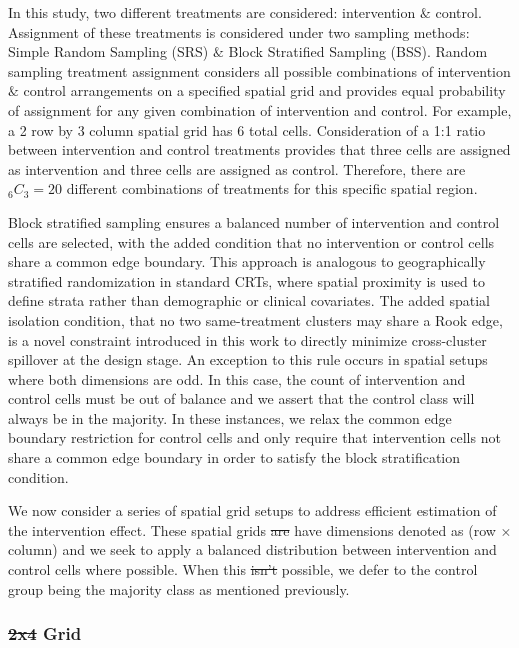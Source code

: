 \documentclass{article}[11pt]
\makeatletter
\providecommand{\DIFaddtex}[1]{{\protect\color{blue}\uwave{#1}}} %
\providecommand{\DIFdeltex}[1]{{\protect\color{red}\sout{#1}}} %
\providecommand{\DIFaddbegin}{} %
\providecommand{\DIFaddend}{} %
\providecommand{\DIFdelbegin}{} %
\providecommand{\DIFdelend}{} %
\providecommand{\DIFadd}[1]{\texorpdfstring{\DIFaddtex{#1}}{#1}} %
\providecommand{\DIFdel}[1]{\texorpdfstring{\DIFdeltex{#1}}{}} %
\providecommand{\DIFscaledelfig}{0.5}
\newlength{\DIFdelgraphicswidth} %
\newlength{\DIFdelgraphicsheight} %
\providecommand{\DIFaddincludegraphics}[2][]{{\color{blue}\fbox{\DIFOincludegraphics[#1]{#2}}}} %
\providecommand{\DIFdelincludegraphics}[2][]{%
\sbox{\DIFdelgraphicsbox}{\DIFOincludegraphics[#1]{#2}}%
\settoboxwidth{\DIFdelgraphicswidth}{\DIFdelgraphicsbox} %
\settoboxtotalheight{\DIFdelgraphicsheight}{\DIFdelgraphicsbox} %
\scalebox{\DIFscaledelfig}{%
\parbox[b]{\DIFdelgraphicswidth}{\usebox{\DIFdelgraphicsbox}\\[-\baselineskip] \rule{\DIFdelgraphicswidth}{0em}}\llap{\resizebox{\DIFdelgraphicswidth}{\DIFdelgraphicsheight}{%
\setlength{\unitlength}{\DIFdelgraphicswidth}%
\begin{picture}(1,1)%
\thicklines\linethickness{2pt} %
{\color[rgb]{1,0,0}\put(0,0){\framebox(1,1){}}}%
{\color[rgb]{1,0,0}\put(0,0){\line( 1,1){1}}}%
{\color[rgb]{1,0,0}\put(0,1){\line(1,-1){1}}}%
\end{picture}%
}\hspace*{3pt}}} %
} %
\DeclareRobustCommand{\DIFaddbegin}{\DIFOaddbegin \let\includegraphics\DIFaddincludegraphics} %
\DeclareRobustCommand{\DIFaddend}{\DIFOaddend \let\includegraphics\DIFOincludegraphics} %
\DeclareRobustCommand{\DIFdelbegin}{\DIFOdelbegin \let\includegraphics\DIFdelincludegraphics} %
\DeclareRobustCommand{\DIFdelend}{\DIFOaddend \let\includegraphics\DIFOincludegraphics} %
\let\sout@orig\sout %
\renewcommand{\sout}[1]{\ifmmode\text{\sout@orig{\ensuremath{#1}}}\else\sout@orig{#1}\fi} %
\makeatother
\begin{document}
In this study, two different treatments are considered: intervention $\&$ control. Assignment of these treatments is considered under two sampling methods: Simple Random Sampling (SRS) $\&$ Block Stratified Sampling (BSS). Random sampling treatment assignment considers all possible combinations of intervention $\&$ control arrangements on a specified spatial grid and provides equal probability of assignment for any given combination of intervention and control. For example, a 2 row by 3 column spatial grid has 6 total cells. Consideration of a 1:1 ratio between intervention and control treatments provides that three cells are assigned as intervention and three cells are assigned as control. Therefore, there are %
$_{6}C_{3}=20$ different combinations of treatments for this specific spatial region. 

Block stratified sampling ensures a balanced number of intervention and control cells are selected, with the added condition that no intervention or control cells share a common edge boundary. This approach is analogous to geographically stratified randomization in standard CRTs, where spatial proximity is used to define strata rather than demographic or clinical covariates\cite{mccann_spatial_2018}\cite{crisp_covariate-constrained_2023}\cite{hayes_cluster_2017}. The added spatial isolation condition, that no two same-treatment clusters may share a Rook edge, is a novel constraint introduced in this work to directly minimize cross-cluster spillover at the design stage. An exception to this rule occurs in spatial setups where both dimensions are odd. In this case, the count of intervention and control cells must be out of balance and we assert that the control class will always be in the majority. In these instances, we relax the common edge boundary restriction for control cells and only require that intervention cells not share a common edge boundary in order to satisfy the block stratification condition.

We now consider a series of spatial grid setups to address efficient estimation of the intervention effect. These spatial grids \DIFdelbegin \DIFdel{are }\DIFdelend have dimensions denoted as (row $\times$ column) and we seek to apply a balanced distribution between intervention and control cells where possible. When this \DIFdelbegin \DIFdel{isn't }\DIFdelend \DIFaddbegin \DIFadd{is not }\DIFaddend possible, we defer to the control group being the majority class as mentioned previously.

\subsubsection{\DIFdelbegin \DIFdel{2x4 }\DIFdelend \DIFaddbegin \DIFadd{$2\times4$ }\DIFaddend Grid}
\end{document}

